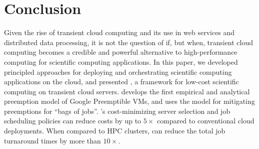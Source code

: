 
\section{Conclusion}
\label{sec:conclusion}
Given the rise of transient cloud computing and its use in web services and distributed data processing, it is not the question of if, but when, transient cloud computing becomes a credible and powerful alternative to high-performance computing for scientific computing applications. 
In this paper, we developed principled approaches for deploying and orchestrating scientific computing applications on the cloud, and presented \sysname, a framework for low-cost scientific computing on  transient cloud servers. 
\sysname develops the first empirical and analytical preemption model of Google Preemptible VMs, and uses the model for mitigating preemptions for ``bags of jobs''. 
\sysname's cost-minimizing server selection and job scheduling policies can reduce costs by up to $5\times$ compared to conventional cloud deployments.
When compared to HPC clusters, \sysname can reduce the total job turnaround times by more than $10\times$. 


